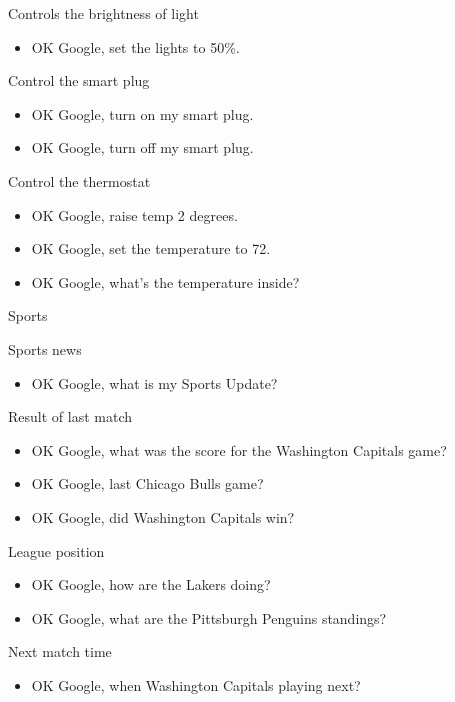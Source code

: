 \documentclass[
  a4paper,
]{article}
\providecommand{\tightlist}{%
  \setlength{\itemsep}{0pt}\setlength{\parskip}{0pt}}\usepackage{longtable,booktabs,array}
\begin{document}
Controls the brightness of light

\begin{itemize}
\tightlist
\item
  OK Google, set the lights to 50\%.
\end{itemize}

Control the smart plug

\begin{itemize}
\item
  OK Google, turn on my smart plug.
\item
  OK Google, turn off my smart plug.
\end{itemize}

Control the thermostat

\begin{itemize}
\item
  OK Google, raise temp 2 degrees.
\item
  OK Google, set the temperature to 72.
\item
  OK Google, what's the temperature inside?
\end{itemize}

Sports

Sports news

\begin{itemize}
\tightlist
\item
  OK Google, what is my Sports Update?
\end{itemize}

Result of last match

\begin{itemize}
\item
  OK Google, what was the score for the Washington Capitals game?
\item
  OK Google, last Chicago Bulls game?
\item
  OK Google, did Washington Capitals win?
\end{itemize}

League position

\begin{itemize}
\item
  OK Google, how are the Lakers doing?
\item
  OK Google, what are the Pittsburgh Penguins standings?
\end{itemize}

Next match time

\begin{itemize}
\tightlist
\item
  OK Google, when Washington Capitals playing next?
\end{itemize}
\end{document}
